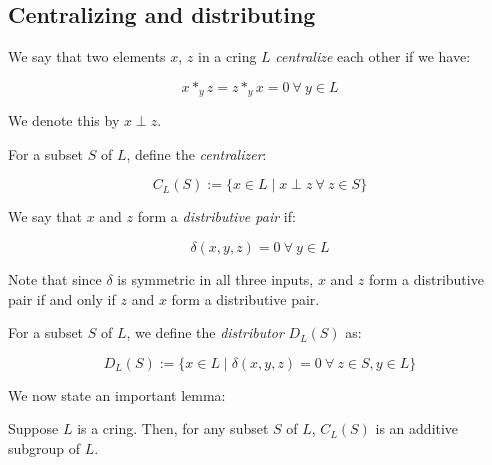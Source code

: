 \documentclass[10pt]{amsart}
\begin{document}
\subsection{Centralizing and distributing}

We say that two elements $x$, $z$ in a cring $L$
{\em centralize} each other if we have:

\begin{equation}
  x *_y z = z *_y x = 0 \ \forall \ y \in L
\end{equation}

We denote this by $x \perp z$.  

For a subset $S$ of $L$, define the {\em centralizer}:

\begin{equation}
  C_L(S) := \{ x \in L \mid x \perp z \ \forall \ z \in S \}
\end{equation}

We say that $x$ and $z$ form a {\em distributive pair} if:

\begin{equation}
  \delta(x,y,z) = 0 \ \forall \ y \in L
\end{equation}

Note that since $\delta$ is symmetric in all three inputs, $x$ and $z$
form a distributive pair if and only if $z$ and $x$ form a
distributive pair.

For a subset $S$ of $L$, we define the {\em distributor} $D_L(S)$ as:

\begin{equation}
  D_L(S) := \{ x \in L \mid \delta(x,y,z) = 0 \ \forall \ z \in S,y \in L \}
\end{equation}

We now state an important lemma:

\begin{lemma}
  Suppose $L$ is a cring. Then, for any subset $S$ of $L$,
  $C_L(S)$ is an additive subgroup of $L$.
\end{lemma}
\end{document}
